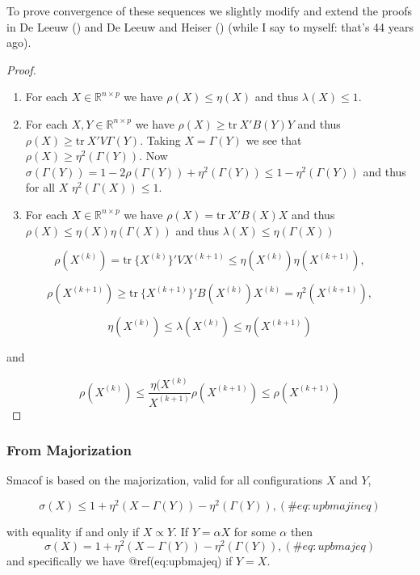 \documentclass[
  12pt,
  letterpaper,
  DIV=11,
  numbers=noendperiod]{scrreprt}
\theoremstyle{remark}
\begin{document}
To prove convergence of these sequences we slightly modify and extend
the proofs in De Leeuw () and De Leeuw
and Heiser () (while I say to
myself: that's 44 years ago).

\begin{proof}
\leavevmode

\begin{enumerate}
\def\labelenumi{\arabic{enumi}.}
\item
  For each \(X\in\mathbb{R}^{n\times p}\) we have \(\rho(X)\leq\eta(X)\)
  and thus \(\lambda(X)\leq 1\).
\item
  For each \(X,Y\in\mathbb{R}^{n\times p}\) we have
  \(\rho(X)\geq\text{tr}\ X'B(Y)Y\) and thus
  \(\rho(X)\geq\text{tr}\ X'V\Gamma(Y)\). Taking \(X=\Gamma(Y)\) we see
  that \(\rho(X)\geq\eta^2(\Gamma(Y))\). Now
  \(\sigma(\Gamma(Y))=1-2\rho(\Gamma(Y))+\eta^2(\Gamma(Y))\leq 1-\eta^2(\Gamma(Y))\)
  and thus for all \(X\) \(\eta^2(\Gamma(X)) \leq 1\).
\item
  For each \(X\in\mathbb{R}^{n\times p}\) we have
  \(\rho(X)=\text{tr}\ X'B(X)X\) and thus
  \(\rho(X)\leq\eta(X)\eta(\Gamma(X))\) and thus
  \(\lambda(X)\leq\eta(\Gamma(X))\)
\end{enumerate}

\[
\rho(X^{(k)})=\text{tr}\ \{X^{(k)}\}'VX^{(k+1)}\leq\eta(X^{(k)})\eta(X^{(k+1)}),
\]

\[
\rho(X^{(k+1)})\geq\text{tr}\ \{X^{(k+1)}\}'B(X^{(k)})X^{(k)}=\eta^{2}(X^{(k+1)}),
\]

\[
\eta(X^{(k)})\leq\lambda(X^{(k)})\leq\eta(X^{(k+1)})
\]

and

\[
\rho(X^{(k)})\leq\frac{\eta(X^{(k)}}{X^{(k+1)}}\rho(X^{(k+1)})\leq\rho(X^{(k+1)})
\]
\end{proof}

\subsubsection{From Majorization}\label{from-majorization}

Smacof is based on the majorization, valid for all configurations \(X\)
and \(Y\),

\begin{equation}
\sigma(X)\leq 1+\eta^2(X-\Gamma(Y))-\eta^2(\Gamma(Y)),
(\#eq:upbmajineq)
\end{equation}

with equality if and only if \(X\propto Y\). If \(Y=\alpha X\) for some
\(\alpha\) then \begin{equation}
\sigma(X)=1+\eta^2(X-\Gamma(Y))-\eta^2(\Gamma(Y)),
(\#eq:upbmajeq)
\end{equation} and specifically we have @ref(eq:upbmajeq) if \(Y=X\).
\end{document}
